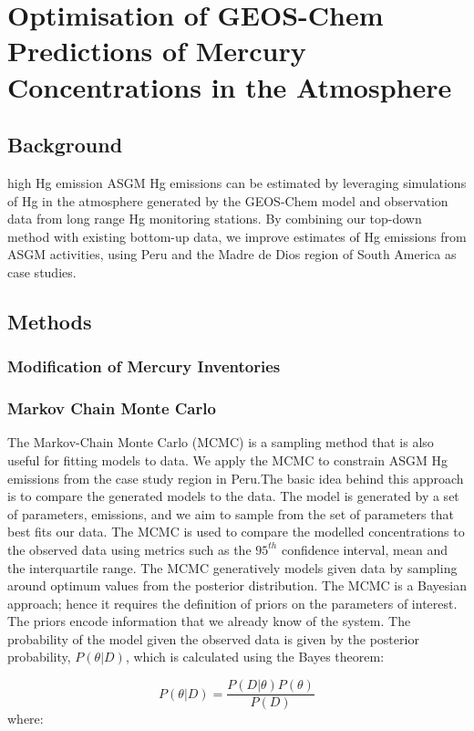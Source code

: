 \chapter{Optimisation of GEOS-Chem Predictions of Mercury Concentrations in the Atmosphere}
\section{Background}

high Hg emission ASGM Hg emissions can be estimated by leveraging simulations of Hg in the atmosphere generated by the GEOS-Chem model and observation data from long range Hg monitoring stations. By combining our top-down method with existing bottom-up data, we improve estimates of Hg emissions from ASGM activities, using Peru and the Madre de Dios region of South America as case studies.

\section{Methods}

\subsection{Modification of Mercury Inventories}

\subsection{Markov Chain Monte Carlo}

\begin{flushleft}
The Markov-Chain Monte Carlo (MCMC) is a sampling method that is also useful for fitting models to data\cite{hogg_data_2018}. We apply the MCMC to constrain ASGM Hg emissions from the case study region in Peru.The basic idea behind this approach is to compare the generated models to the data. The model is generated by a set of parameters, emissions, and we aim to sample from the set of parameters that best fits our data. The MCMC is used to compare the modelled concentrations to the observed data using metrics such as the $95^{th}$ confidence interval, mean and the interquartile range. The MCMC generatively models given data by sampling around optimum values from the posterior distribution. The MCMC is a Bayesian approach; hence it requires the definition of priors on the parameters of interest. The priors encode information that we already know of the system. The probability of the model given the observed data is given by the posterior probability, $P(\theta|D)$, which is calculated using the Bayes theorem:

\begin{equation}
\label{bayes_eq}
P(\theta|D)=\frac{P(D|\theta)P(\theta)}{P(D)}
\end{equation}
where:
\end{flushleft}

